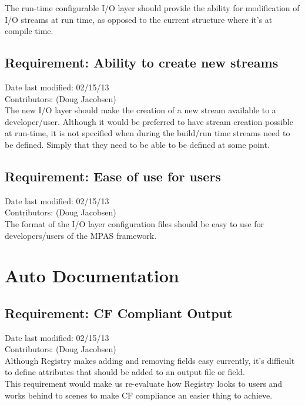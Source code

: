 \documentclass[11pt]{report}
\begin{document}
The run-time configurable I/O layer should provide the ability for modification
of I/O streams at run time, as opposed to the current structure where it's at
compile time.

\subsection{Requirement: Ability to create new streams}
Date last modified: 02/15/13 \\
Contributors: (Doug Jacobsen) \\

The new I/O layer should make the creation of a new stream available to a
developer/user. Although it would be preferred to have stream creation possible
at run-time, it is not specified when during the build/run time streams need to
be defined. Simply that they need to be able to be defined at some point.

\subsection{Requirement: Ease of use for users}
Date last modified: 02/15/13 \\
Contributors: (Doug Jacobsen) \\

The format of the I/O layer configuration files should be easy to use for
developers/users of the MPAS framework.

\section{Auto Documentation}

\subsection{Requirement: CF Compliant Output}
Date last modified: 02/15/13 \\
Contributors: (Doug Jacobsen) \\

Although Registry makes adding and removing fields easy currently, it's
difficult to define attributes that should be added to an output file or field. \\

This requirement would make us re-evaluate how Registry looks to users and
works behind to scenes to make CF compliance an easier thing to achieve. \\
\end{document}
